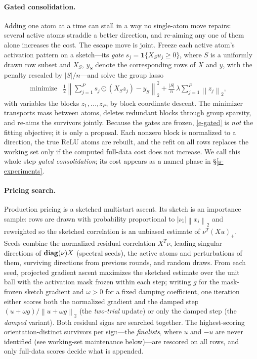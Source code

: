 \documentclass[12pt]{article}
\theoremstyle{plain}
\theoremstyle{definition}
\newcommand{\norm}[1]{\left\lVert #1\right\rVert}
\newcommand{\relu}[1]{\left(#1\right)_+}
\newcommand{\ones}{\mathbf{1}}
\newcommand{\diag}{\mathop{\bf diag}}
\begin{document}
\paragraph{Gated consolidation.}
Adding one atom at a time can stall in a way no single-atom move repairs:
several active atoms straddle a better direction, and re-aiming any one of
them alone increases the cost. The escape move is joint. Freeze each active
atom's activation pattern on a sketch---its \emph{gate}
$s_j=\ones\{X_Su_j\ge0\}$, where $S$ is a uniformly drawn row subset and
$X_S$, $y_S$ denote the corresponding rows of $X$ and $y$, with the penalty
rescaled by $|S|/n$---and solve the group lasso
\begin{equation}\label{e-gated}
\begin{array}{ll}
\mbox{minimize} & \displaystyle
    \frac12\norm{\sum_{j=1}^P s_j\odot(X_Sz_j)-y_S}_2^2
    +\frac{|S|}{n}\,\lambda\sum_{j=1}^P\norm{z_j}_2,
\end{array}
\end{equation}
with variables the blocks $z_1,\ldots,z_P$, by block coordinate descent. The
minimizer transports mass between atoms, deletes redundant blocks through
group sparsity, and re-aims the survivors jointly. Because the gates are
frozen, \eqref{e-gated} is \emph{not} the fitting objective; it is only a
proposal. Each nonzero block is normalized to a direction, the true ReLU
atoms are rebuilt, and the refit on all rows replaces the working set only if
the computed full-data cost does not increase. We call this whole step
\emph{gated consolidation}; its cost appears as a named phase in
\S\ref{s-experiments}.

\paragraph{Pricing search.}
Production pricing is a sketched multistart ascent. Its sketch is an
importance sample: rows are drawn with probability proportional to
$|\nu_i|\norm{x_i}_2$ and reweighted so the sketched correlation is an
unbiased estimate of $\nu^T\relu{Xu}$. Seeds combine the normalized residual
correlation $X^T\nu$, leading singular directions of $\diag(\nu)X$ (spectral
seeds), the active atoms and perturbations of them, surviving directions from
previous rounds, and random draws. From each seed, projected gradient ascent
maximizes the sketched estimate over the unit ball with the activation mask
frozen within each step; writing $g$ for the mask-frozen sketch gradient and
$\omega>0$ for a fixed damping coefficient, one iteration either scores both
the normalized gradient and the damped step
$(u+\omega g)/\norm{u+\omega g}_2$ (the \emph{two-trial} update) or only the
damped step (the \emph{damped} variant). Both residual signs are searched
together. The highest-scoring orientation-distinct survivors per sign---the
\emph{finalists}, where $u$ and $-u$ are never identified (see working-set
maintenance below)---are rescored on all rows, and only full-data scores
decide what is appended.
\end{document}

